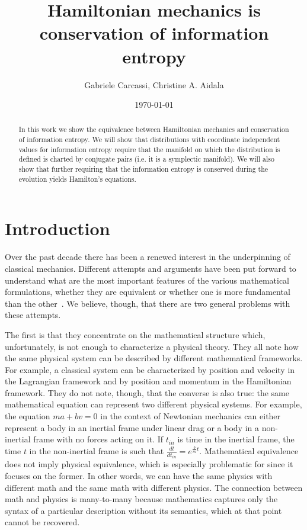 \documentclass[11pt]{article}
\begin{document}
\title{Hamiltonian mechanics is conservation of information entropy}
\author{Gabriele Carcassi, Christine A. Aidala}



\date{\today}

\maketitle

\begin{abstract}
	In this work we show the equivalence between Hamiltonian mechanics and conservation of information entropy. We will show that distributions with coordinate independent values for information entropy require that the manifold on which the distribution is defined is charted by conjugate pairs (i.e. it is a symplectic manifold). We will also show that further requiring that the information entropy is conserved during the evolution yields Hamilton's equations.
\end{abstract}

\tableofcontents
\newpage

\section{Introduction}

Over the past decade there has been a renewed interest in the underpinning of classical mechanics. Different attempts and arguments have been put forward to understand what are the most important features of the various mathematical formulations, whether they are equivalent or whether one is more fundamental than the other~\cite{North,Curiel,Barrett1,Barrett2}. We believe, though, that there are two general problems with these attempts.

The first is that they concentrate on the mathematical structure which, unfortunately, is not enough to characterize a physical theory. They all note how the same physical system can be described by different mathematical frameworks. For example, a classical system can be characterized by position and velocity in the Lagrangian framework and by position and momentum in the Hamiltonian framework. They do not note, though, that the converse is also true: the same mathematical equation can represent two different physical systems. For example, the equation $ma + bv = 0$ in the context of Newtonian mechanics can either represent a body in an inertial frame under linear drag or a body in a non-inertial frame with no forces acting on it. If $t_{in}$ is time in the inertial frame, the time $t$ in the non-inertial frame is such that  $\frac{dt}{dt_{in}} = e^{\frac{b}{m}t}$. Mathematical equivalence does not imply physical equivalence, which is especially problematic for \cite{Barrett2} since it focuses on the former. In other words, we can have the same physics with different math and the same math with different physics. The connection between math and physics is many-to-many because mathematics captures only the syntax of a particular description without its semantics, which at that point cannot be recovered.
\end{document}
